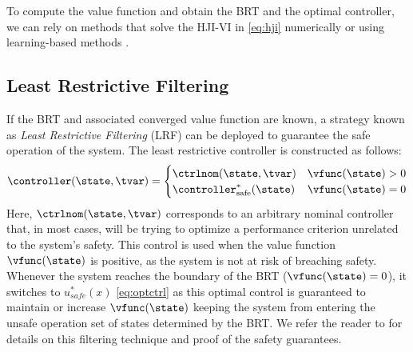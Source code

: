 To compute the value function and obtain the BRT and the optimal controller, we can rely on methods that solve the HJI-VI in \eqref{eq:hji} numerically \cite{bansal2020provably, bui2022optimizeddp,mitchell2004toolbox,hj_reach_ASL2023} or using learning-based methods \cite{bansal2021deepreach,fisac2019bridging}.

\subsection{Least Restrictive Filtering}

If the BRT and associated converged value function are known, a strategy known as \textit{Least Restrictive Filtering} (LRF) can be deployed to guarantee the safe operation of the system.
The least restrictive controller is constructed as follows:
% 
\begin{equation}\label{eq:lst_restrict_safety_ctrl}
\controller(\state, \tvar) = \begin{cases}
  \ctrlnom(\state, \tvar) & \vfunc(\state)> 0 \\
   \controller^*_{\text{safe}}(\state) & \vfunc(\state) = 0
\end{cases}
\end{equation}
% 
Here, $\ctrlnom(\state, \tvar)$ corresponds to an arbitrary nominal controller that, in most cases, will be trying to optimize a performance criterion unrelated to the system's safety. This control is used when the value function $\vfunc(\state)$ is positive, as the system is not at risk of breaching safety. Whenever the system reaches the boundary of the BRT ($\vfunc(\state)=0$), it switches to $u^{*}_{safe}(x)$ \eqref{eq:optctrl} as this optimal control is guaranteed to maintain or increase $\vfunc(\state)$ keeping the system from entering the unsafe operation set of states determined by the BRT. We refer the reader to \cite{borquezFiltering2023} for details on this filtering technique and proof of the safety guarantees.

